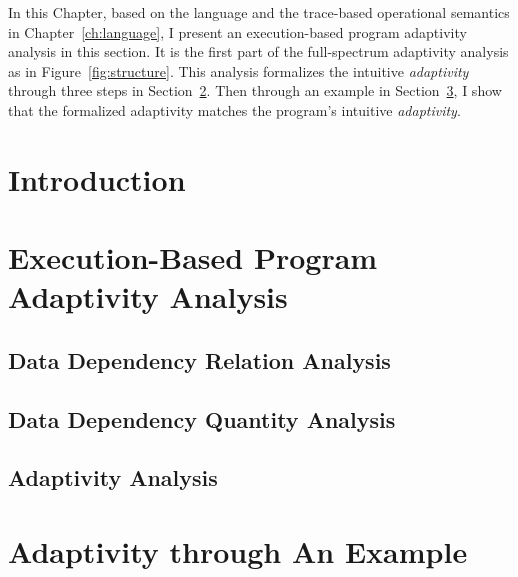 In this Chapter, based on the language and the trace-based operational semantics in Chapter~\ref{ch:language},
I present an execution-based program adaptivity analysis in this section.
It is the first part of the full-spectrum adaptivity analysis as in Figure~\ref{fig:structure}. 
This analysis formalizes the intuitive \emph{adaptivity} through three steps in 
Section~\ref{sec:dynamic-analysis}.
Then through an example in Section~\ref{sec:dynamic-examples}, I show that the formalized
adaptivity matches the program's intuitive \emph{adaptivity}.
\section{Introduction}
\label{sec:dynamic-intro}
% 


% 

\section{Execution-Based Program Adaptivity Analysis}
\label{sec:dynamic-analysis}

\subsection{Data Dependency Relation Analysis}
\label{sec:dynamic-datadep}


\subsection{Data Dependency Quantity Analysis}
\label{sec:dynamic-reachability}
%

\subsection{Adaptivity Analysis}
\label{sec:dynamic-adapt}
%
%
\section{Adaptivity through An Example}
\label{sec:dynamic-examples}


%
